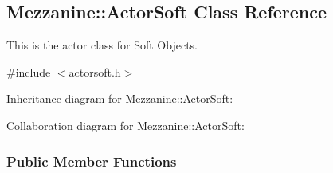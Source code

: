 \hypertarget{classMezzanine_1_1ActorSoft}{\subsection{Mezzanine\-:\-:Actor\-Soft Class Reference}
\label{classMezzanine_1_1ActorSoft}
}


This is the actor class for Soft Objects.  




{\ttfamily \#include $<$actorsoft.\-h$>$}



Inheritance diagram for Mezzanine\-:\-:Actor\-Soft\-:


Collaboration diagram for Mezzanine\-:\-:Actor\-Soft\-:
\subsubsection*{Public Member Functions}
